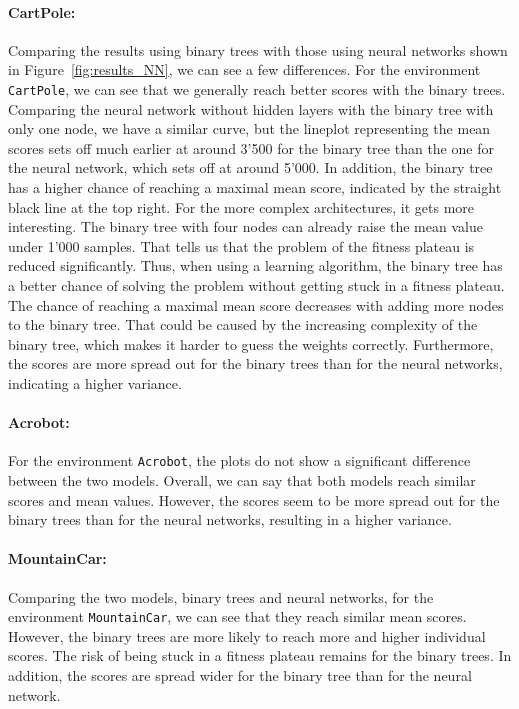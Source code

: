 \paragraph*{CartPole:} Comparing the results using binary trees with those using neural networks shown in Figure~\ref{fig:results_NN}, we can see a few differences. For the environment \verb|CartPole|, we can see that we generally reach  better scores with the binary trees. Comparing the neural network without hidden layers with the binary tree with only one node, we have a similar curve, but the lineplot representing the mean scores sets off much earlier at around 3'500 for the binary tree than the one for the neural network, which sets off at around 5'000. In addition, the binary tree has a higher chance of reaching a maximal mean score, indicated by the straight black line at the top right. For the more complex architectures, it gets more interesting. The binary tree with four nodes can already raise the mean value under 1'000 samples. That tells us that the problem of the fitness plateau is reduced significantly. Thus, when using a learning algorithm, the binary tree has a better chance of solving the problem without getting stuck in a fitness plateau. The chance of reaching a maximal mean score decreases with adding more nodes to the binary tree. That could be caused by the increasing complexity of the binary tree, which makes it harder to guess the weights correctly. Furthermore, the scores are more spread out for the binary trees than for the neural networks, indicating a higher variance.

\paragraph*{Acrobot:} For the environment \verb|Acrobot|, the plots do not show a significant difference between the two models. Overall, we can say that both models reach similar scores and mean values. However, the scores seem to be more spread out for the binary trees than for the neural networks, resulting in a higher variance.

\paragraph*{MountainCar:} Comparing the two models, binary trees and neural networks, for the environment \verb|MountainCar|, we can see that they reach similar mean scores. However, the binary trees are more likely to reach more and higher individual scores. The risk of being stuck in a fitness plateau remains for the binary trees. In addition, the scores are spread wider for the binary tree than for the neural network.

